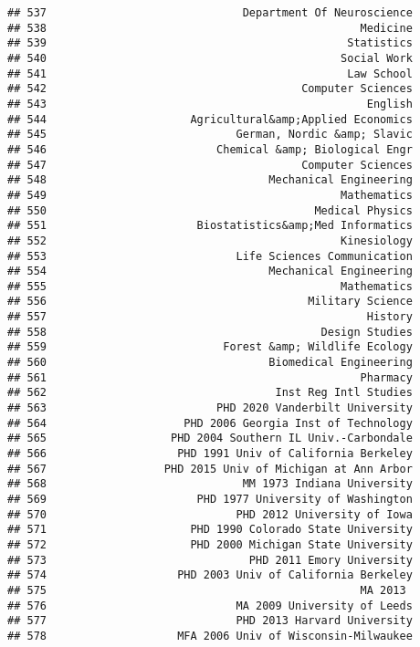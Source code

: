 \documentclass[
]{article}
\begin{document}
\begin{verbatim}
## 537                              Department Of Neuroscience
## 538                                                Medicine
## 539                                              Statistics
## 540                                             Social Work
## 541                                              Law School
## 542                                       Computer Sciences
## 543                                                 English
## 544                      Agricultural&amp;Applied Economics
## 545                             German, Nordic &amp; Slavic
## 546                          Chemical &amp; Biological Engr
## 547                                       Computer Sciences
## 548                                  Mechanical Engineering
## 549                                             Mathematics
## 550                                         Medical Physics
## 551                       Biostatistics&amp;Med Informatics
## 552                                             Kinesiology
## 553                             Life Sciences Communication
## 554                                  Mechanical Engineering
## 555                                             Mathematics
## 556                                        Military Science
## 557                                                 History
## 558                                          Design Studies
## 559                           Forest &amp; Wildlife Ecology
## 560                                  Biomedical Engineering
## 561                                                Pharmacy
## 562                                   Inst Reg Intl Studies
## 563                          PHD 2020 Vanderbilt University
## 564                     PHD 2006 Georgia Inst of Technology
## 565                   PHD 2004 Southern IL Univ.-Carbondale
## 566                    PHD 1991 Univ of California Berkeley
## 567                  PHD 2015 Univ of Michigan at Ann Arbor
## 568                              MM 1973 Indiana University
## 569                       PHD 1977 University of Washington
## 570                             PHD 2012 University of Iowa
## 571                      PHD 1990 Colorado State University
## 572                      PHD 2000 Michigan State University
## 573                               PHD 2011 Emory University
## 574                    PHD 2003 Univ of California Berkeley
## 575                                                MA 2013 
## 576                             MA 2009 University of Leeds
## 577                             PHD 2013 Harvard University
## 578                    MFA 2006 Univ of Wisconsin-Milwaukee

\end{verbatim}
\end{document}
